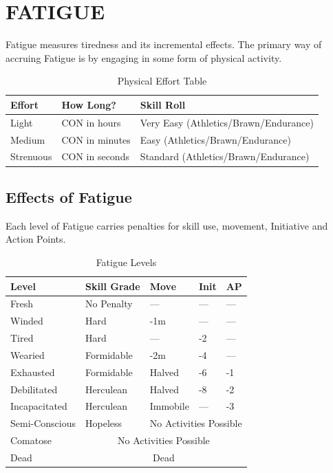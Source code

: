 \documentclass[10pt]{article}
\begin{document}
\section{FATIGUE}
\label{sec:fatigue}
Fatigue measures tiredness and its incremental effects. The primary way of accruing Fatigue is by engaging in some form of physical activity.

\begin{table}[h]
\centering
\caption{Physical Effort Table}
\label{tab:physical-effort}
\begin{tabular}{lll}
\toprule
\textbf{Effort} & \textbf{How Long?} & \textbf{Skill Roll} \\
\midrule
Light & CON in hours & Very Easy (Athletics/Brawn/Endurance) \\
Medium & CON in minutes & Easy (Athletics/Brawn/Endurance) \\
Strenuous & CON in seconds & Standard (Athletics/Brawn/Endurance) \\
\bottomrule
\end{tabular}
\end{table}

\subsection{Effects of Fatigue}
 Each level of Fatigue carries penalties for skill use, movement, Initiative and Action Points.

\begin{table}[h]
\centering
\caption{Fatigue Levels}
\label{tab:fatigue-levels}
\begin{tabular}{lllll}
\toprule
\textbf{Level} & \textbf{Skill Grade} & \textbf{Move} & \textbf{Init} & \textbf{AP} \\
\midrule
Fresh & No Penalty & — & — & — \\
Winded & Hard & -1m & — & — \\
Tired & Hard & — & -2 & — \\
Wearied & Formidable & -2m & -4 & — \\
Exhausted & Formidable & Halved & -6 & -1 \\
Debilitated & Herculean & Halved & -8 & -2 \\
Incapacitated & Herculean & Immobile & — & -3 \\
Semi-Conscious & Hopeless & \multicolumn{3}{c}{No Activities Possible} \\
Comatose & \multicolumn{4}{c}{No Activities Possible} \\
Dead & \multicolumn{4}{c}{Dead} \\
\bottomrule
\end{tabular}
\end{table}
\end{document}
